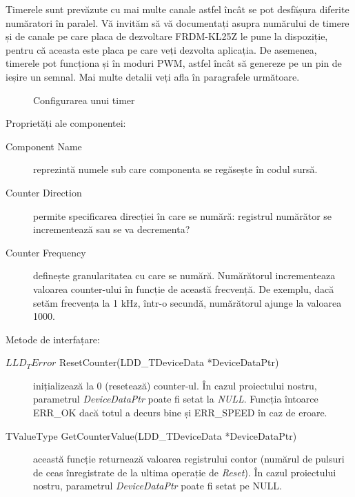 Timerele sunt prevăzute cu mai multe canale astfel încât se pot desfășura diferite număratori în paralel. Vă invităm să vă documentați asupra numărului de timere și de canale pe care placa de dezvoltare FRDM-KL25Z le pune la dispoziție, pentru că aceasta este placa pe care veți dezvolta aplicația. De asemenea, timerele pot funcționa și în moduri PWM, astfel încât să genereze pe un pin de ieșire un semnal. Mai multe detalii veți afla în paragrafele următoare.

\begin{figure}
  \vspace{-20pt}
  \vspace{-15pt}
  \caption{\label{fig:CodeWarrior-Timer} Configurarea unui timer}
  \vspace{-20pt}
\end{figure}

Proprietăți ale componentei:

\begin{description}
    \item[Component Name] reprezintă numele sub care componenta se regăsește în codul sursă.
    \item[Counter Direction] permite specificarea direcției în care se numără: registrul numărător se incrementează sau se va decrementa?
    \item[Counter Frequency] definește granularitatea cu care se numără. Numărătorul incrementeaza valoarea counter-ului în funcție de această frecvență. De exemplu, dacă setăm frecvența la 1 kHz, într-o secundă, numărătorul ajunge la valoarea 1000. 
\end{description}

Metode de interfațare:

\begin{description}
    \item[$LLD_TError$ ResetCounter(LDD\_TDeviceData *DeviceDataPtr)] inițializează la 0 (resetează) counter-ul. În cazul proiectului nostru, parametrul \textit{DeviceDataPtr} poate fi setat la \textit{NULL}. Funcția întoarce ERR\_OK dacă totul a decurs bine și ERR\_SPEED în caz de eroare. 
    \item[TValueType GetCounterValue(LDD\_TDeviceData *DeviceDataPtr)] această funcție returnează valoarea registrului contor (numărul de pulsuri de ceas înregistrate de la ultima operație de \textit{Reset}). În cazul proiectului nostru, parametrul \textit{DeviceDataPtr} poate fi setat pe NULL.
\end{description}

